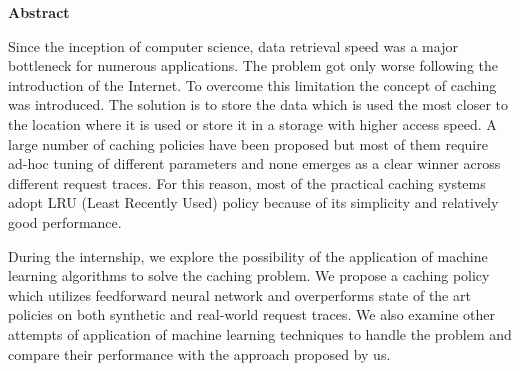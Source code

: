 
\Large \textbf{Abstract}

\normalsize
Since the inception of computer science, data retrieval speed was a major bottleneck for numerous applications. The problem got only worse following the introduction of the Internet. To overcome this limitation the concept of caching was introduced. The solution is to store the data which is used the most closer to the location where it is used or store it in a storage with higher access speed. A large number of caching policies have been proposed but most of them require ad-hoc tuning of different parameters and none emerges as a clear winner across different request traces. For this reason, most of the practical caching systems adopt LRU (Least Recently Used) policy because of its simplicity and relatively good performance.

During the internship, we explore the possibility of the application of machine learning algorithms to solve the caching problem. We propose a caching policy which utilizes feedforward neural network and overperforms state of the art policies on both synthetic and real-world request traces. We also examine other attempts of application of machine learning techniques to handle the problem and compare their performance with the approach proposed by us.
